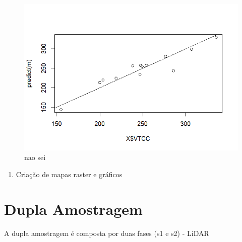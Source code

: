 \documentclass[
]{article}
\providecommand{\tightlist}{%
  \setlength{\itemsep}{0pt}\setlength{\parskip}{0pt}}
\begin{document}
\begin{figure}

{\centering \includegraphics[width=0.5\linewidth]{IMAGES/analise-de-regressao} 

}

\caption{nao sei}\label{fig:unnamed-chunk-19}
\end{figure}

\newpage

\begin{enumerate}
\def\labelenumi{\arabic{enumi}.}
\setcounter{enumi}{14}
\tightlist
\item
  Criação de mapas raster e gráficos
\end{enumerate}

\newpage

\section{Dupla Amostragem}\label{dupla-amostragem}

A dupla amostragem é composta por duas fases (s1 e s2) - LiDAR
\end{document}
